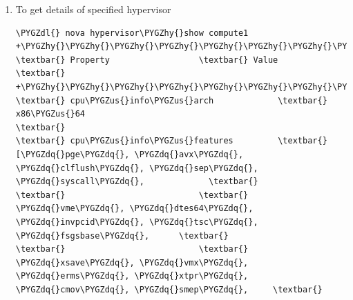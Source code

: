 \documentclass[letterpaper,10pt,english]{sphinxmanual}
\def\PYGZus{\char`\_}
\def\PYGZdl{\char`\$}
\def\PYGZhy{\char`\-}
\def\PYGZdq{\char`\"}
\begin{document}
\begin{enumerate}
\item {} 
To get details of specified hypervisor

\begin{Verbatim}[commandchars=\\\{\}]
\PYGZdl{} nova hypervisor\PYGZhy{}show compute1
+\PYGZhy{}\PYGZhy{}\PYGZhy{}\PYGZhy{}\PYGZhy{}\PYGZhy{}\PYGZhy{}\PYGZhy{}\PYGZhy{}\PYGZhy{}\PYGZhy{}\PYGZhy{}\PYGZhy{}\PYGZhy{}\PYGZhy{}\PYGZhy{}\PYGZhy{}\PYGZhy{}\PYGZhy{}\PYGZhy{}\PYGZhy{}\PYGZhy{}\PYGZhy{}\PYGZhy{}\PYGZhy{}\PYGZhy{}\PYGZhy{}+\PYGZhy{}\PYGZhy{}\PYGZhy{}\PYGZhy{}\PYGZhy{}\PYGZhy{}\PYGZhy{}\PYGZhy{}\PYGZhy{}\PYGZhy{}\PYGZhy{}\PYGZhy{}\PYGZhy{}\PYGZhy{}\PYGZhy{}\PYGZhy{}\PYGZhy{}\PYGZhy{}\PYGZhy{}\PYGZhy{}\PYGZhy{}\PYGZhy{}\PYGZhy{}\PYGZhy{}\PYGZhy{}\PYGZhy{}\PYGZhy{}\PYGZhy{}\PYGZhy{}\PYGZhy{}\PYGZhy{}\PYGZhy{}\PYGZhy{}\PYGZhy{}\PYGZhy{}\PYGZhy{}\PYGZhy{}\PYGZhy{}\PYGZhy{}\PYGZhy{}\PYGZhy{}\PYGZhy{}\PYGZhy{}\PYGZhy{}\PYGZhy{}\PYGZhy{}\PYGZhy{}\PYGZhy{}\PYGZhy{}\PYGZhy{}\PYGZhy{}\PYGZhy{}\PYGZhy{}\PYGZhy{}\PYGZhy{}\PYGZhy{}\PYGZhy{}+
\textbar{} Property                  \textbar{} Value                                                   \textbar{}
+\PYGZhy{}\PYGZhy{}\PYGZhy{}\PYGZhy{}\PYGZhy{}\PYGZhy{}\PYGZhy{}\PYGZhy{}\PYGZhy{}\PYGZhy{}\PYGZhy{}\PYGZhy{}\PYGZhy{}\PYGZhy{}\PYGZhy{}\PYGZhy{}\PYGZhy{}\PYGZhy{}\PYGZhy{}\PYGZhy{}\PYGZhy{}\PYGZhy{}\PYGZhy{}\PYGZhy{}\PYGZhy{}\PYGZhy{}\PYGZhy{}\PYGZhy{}\PYGZhy{}\PYGZhy{}\PYGZhy{}\PYGZhy{}\PYGZhy{}\PYGZhy{}\PYGZhy{}\PYGZhy{}\PYGZhy{}\PYGZhy{}\PYGZhy{}\PYGZhy{}\PYGZhy{}\PYGZhy{}\PYGZhy{}\PYGZhy{}\PYGZhy{}\PYGZhy{}\PYGZhy{}\PYGZhy{}\PYGZhy{}\PYGZhy{}\PYGZhy{}\PYGZhy{}\PYGZhy{}\PYGZhy{}\PYGZhy{}\PYGZhy{}\PYGZhy{}\PYGZhy{}\PYGZhy{}\PYGZhy{}\PYGZhy{}\PYGZhy{}\PYGZhy{}\PYGZhy{}\PYGZhy{}\PYGZhy{}\PYGZhy{}\PYGZhy{}\PYGZhy{}\PYGZhy{}\PYGZhy{}\PYGZhy{}\PYGZhy{}\PYGZhy{}\PYGZhy{}\PYGZhy{}\PYGZhy{}\PYGZhy{}\PYGZhy{}\PYGZhy{}\PYGZhy{}\PYGZhy{}\PYGZhy{}\PYGZhy{}\PYGZhy{}+
\textbar{} cpu\PYGZus{}info\PYGZus{}arch             \textbar{} x86\PYGZus{}64                                                  \textbar{}
\textbar{} cpu\PYGZus{}info\PYGZus{}features         \textbar{} [\PYGZdq{}pge\PYGZdq{}, \PYGZdq{}avx\PYGZdq{}, \PYGZdq{}clflush\PYGZdq{}, \PYGZdq{}sep\PYGZdq{}, \PYGZdq{}syscall\PYGZdq{},             \textbar{}
\textbar{}                           \textbar{}     \PYGZdq{}vme\PYGZdq{}, \PYGZdq{}dtes64\PYGZdq{}, \PYGZdq{}invpcid\PYGZdq{}, \PYGZdq{}tsc\PYGZdq{}, \PYGZdq{}fsgsbase\PYGZdq{},      \textbar{}
\textbar{}                           \textbar{}     \PYGZdq{}xsave\PYGZdq{}, \PYGZdq{}vmx\PYGZdq{}, \PYGZdq{}erms\PYGZdq{}, \PYGZdq{}xtpr\PYGZdq{}, \PYGZdq{}cmov\PYGZdq{}, \PYGZdq{}smep\PYGZdq{},     \textbar{}

\end{Verbatim}
\end{enumerate}
\end{document}

